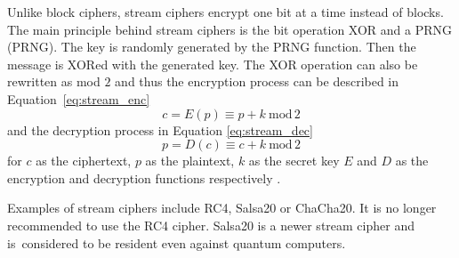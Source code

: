 Unlike block ciphers, stream ciphers encrypt one bit at a time instead of blocks. The main principle behind stream ciphers is the bit operation XOR and a PRNG (\acl{PRNG}). The key is randomly generated by the PRNG function. Then the message is XORed with the generated key. The XOR operation can also be rewritten as mod $2$ and thus the encryption process can be described in Equation~\ref{eq:stream_enc}
\begin{equation}
  \label{eq:stream_enc}
  c = E(p)\equiv p + k\ \mathrm{mod}\,2
\end{equation}
\noindent and the decryption process in Equation \ref{eq:stream_dec}
\begin{equation}
  \label{eq:stream_dec}
  p = D(c)\equiv c + k\ \mathrm{mod}\,2
\end{equation}
\noindent for $c$ as the ciphertext, $p$ as the plaintext, $k$ as the secret key $E$ and $D$ as the encryption and decryption functions respectively \cite{Paar2010}.

Examples of stream ciphers include RC4, Salsa20 or ChaCha20. It is no longer recommended to use the RC4 cipher. Salsa20 is a newer stream cipher and is~considered to be resident even against quantum computers. \cite{Bernstein149}\cite{Ristic2014}
